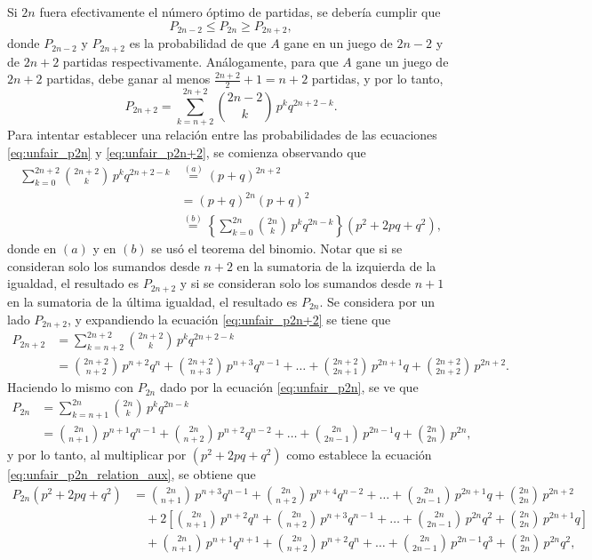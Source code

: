 \documentclass[a4paper]{report}
\begin{document}
Si \(2n\) fuera efectivamente el número óptimo de partidas, se debería cumplir que
\[
 P_{2n-2}\leq P_{2n} \geq P_{2n+2},
\]
donde \(P_{2n-2}\) y \(P_{2n+2}\) es la probabilidad de que \(A\) gane en un juego de \(2n-2\) y de \(2n+2\) partidas respectivamente. Análogamente, para que \(A\) gane un juego de \(2n+2\) partidas, debe ganar al menos \(\frac{2n+2}{2}+1=n+2\) partidas, y por lo tanto,
\begin{equation}\label{eq:unfair_p2n+2}
 P_{2n+2}=\sum_{k=n+2}^{2n+2}\binom{2n-2}{k}\,p^kq^{2n+2-k}.
\end{equation}
Para intentar establecer una relación entre las probabilidades de las ecuaciones \ref{eq:unfair_p2n} y \ref{eq:unfair_p2n+2}, se comienza observando que
\begin{align}\label{eq:unfair_p2n_relation_aux}
 \sum_{k=0}^{2n+2}\binom{2n+2}{k}\,p^kq^{2n+2-k}&\overset{(a)}{=}(p+q)^{2n+2}\nonumber\\
  &=(p+q)^{2n}(p+q)^{2}\nonumber\\
  &\overset{(b)}{=}\left\{\sum_{k=0}^{2n}\binom{2n}{k}\,p^kq^{2n-k}\right\}(p^2+2pq+q^2),
\end{align}
donde en \((a)\) y en \((b)\) se usó el teorema del binomio. Notar que si se consideran solo los sumandos desde \(n+2\) en la sumatoria de la izquierda de la igualdad, el resultado es \(P_{2n+2}\) y si se consideran solo los sumandos desde \(n+1\) en la sumatoria de la última igualdad, el resultado es \(P_{2n}\). Se considera por un lado \(P_{2n+2}\), y expandiendo la ecuación \ref{eq:unfair_p2n+2} se tiene que
\begin{align}\label{eq:unfair_p2n+2_aux}
  P_{2n+2}&=\sum_{k=n+2}^{2n+2}\binom{2n+2}{k}\,p^kq^{2n+2-k}\nonumber\\
  &=\binom{2n+2}{n+2}\,p^{n+2}q^{n}+\binom{2n+2}{n+3}\,p^{n+3}q^{n-1}+\dots+\binom{2n+2}{2n+1}\,p^{2n+1}q+\binom{2n+2}{2n+2}\,p^{2n+2}.
\end{align}
Haciendo lo mismo con \(P_{2n}\) dado por la ecuación \ref{eq:unfair_p2n}, se ve que
\begin{align*}
  P_{2n}&=\sum_{k=n+1}^{2n}\binom{2n}{k}\,p^kq^{2n-k}\\
  &=\binom{2n}{n+1}\,p^{n+1}q^{n-1}+\binom{2n}{n+2}\,p^{n+2}q^{n-2}+\dots+\binom{2n}{2n-1}\,p^{2n-1}q+\binom{2n}{2n}\,p^{2n},
\end{align*}
y por lo tanto, al multiplicar por \((p^2+2pq+q^2)\) como establece la ecuación \ref{eq:unfair_p2n_relation_aux}, se obtiene que
\vspace{0.4cm}
\footnotesize
\begin{align*}
 P_{2n}(p^2+2pq+q^2)&=\binom{2n}{n+1}\,p^{n+3}q^{n-1}+\binom{2n}{n+2}\,p^{n+4}q^{n-2}+\dots+\binom{2n}{2n-1}\,p^{2n+1}q+\binom{2n}{2n}\,p^{2n+2}\\
 &\quad+2\left[\binom{2n}{n+1}\,p^{n+2}q^{n}+\binom{2n}{n+2}\,p^{n+3}q^{n-1}+\dots+\binom{2n}{2n-1}\,p^{2n}q^2+\binom{2n}{2n}\,p^{2n+1}q\right]\\
 &\quad+\binom{2n}{n+1}\,p^{n+1}q^{n+1}+\binom{2n}{n+2}\,p^{n+2}q^{n}+\dots+\binom{2n}{2n-1}\,p^{2n-1}q^3+\binom{2n}{2n}\,p^{2n}q^2,\\
\end{align*}
\end{document}
